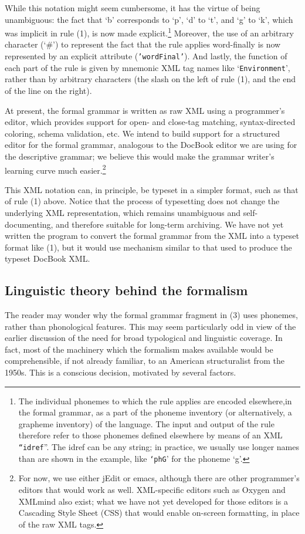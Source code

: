 While this notation might seem cumbersome, it has the virtue of being unambiguous: the fact that `b' corresponds to `p', `d' to `t', and `g' to `k', which was implicit in rule (1), is now made explicit.\footnote{The
  individual phonemes to which the rule applies are encoded elsewhere,in the formal grammar, as a part of the phoneme inventory (or alternatively, a grapheme inventory) of the language. The input and output of the rule therefore refer to those phonemes defined elsewhere by means of an XML \texttt{``idref}''. The idref can be any string; in practice, we usually use longer names than are shown in the example, like \texttt{`phG}' for the phoneme `g'.
} 
Moreover, the use of an arbitrary character (`\#') to represent the fact that the rule applies word-finally is now represented by an explicit attribute (\texttt{'wordFinal'}). And lastly, the function of each part of the rule is given by mnemonic XML tag names like `\texttt{Environment}', rather than by arbitrary characters (the slash on the left of rule (1), and the end of the line on the right). 

At present, the formal grammar is written as raw XML using a programmer's editor, which provides support for open- and close-tag matching, syntax-directed coloring, schema validation, etc. We intend to build support for a structured editor for the formal grammar, analogous to the DocBook editor we are using for the descriptive grammar; we believe this would make the grammar writer's learning curve  much easier.\footnote{For
  now, we use either jEdit or emacs, although there are other programmer's editors that would work as well. XML-specific editors such as Oxygen and XMLmind also exist; what we have not yet developed for those editors is a Cascading Style Sheet (CSS) that would enable on-screen formatting, in place of the raw XML tags.
}

This XML notation can, in principle, be typeset in a simpler format, such as that of rule (1) above. Notice that the process of typesetting does not change the underlying XML representation, which remains unambiguous and self-documenting, and therefore suitable for long-term archiving. We have not yet written the program to convert the formal grammar from the XML into a typeset format like (1), but it would use mechanism similar to that used to produce the typeset DocBook XML.

\subsection{Linguistic theory behind the formalism}
\label{bkm:RefHeading72467100141}
The reader may wonder why the formal grammar fragment in (3) uses phonemes, rather than phonological features. This may seem particularly odd in view of the earlier discussion of the need for broad typological and linguistic coverage. In fact, most of the machinery which the formalism makes available would be comprehensible, if not already familiar, to an American structuralist from the 1950s. This is a conscious decision, motivated by several factors.


